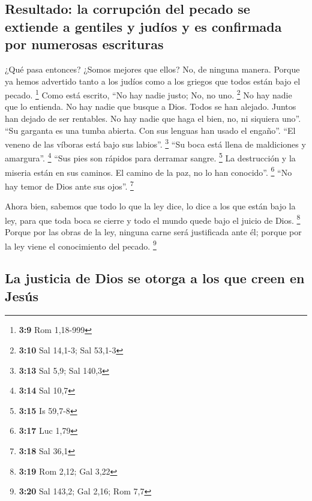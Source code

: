 \begin{paracol}{2}
\hypertarget{resultado-la-corrupciuxf3n-del-pecado-se-extiende-a-gentiles-y-juduxedos-y-es-confirmada-por-numerosas-escrituras}{%
\subsection{Resultado: la corrupción del pecado se extiende a gentiles y
judíos y es confirmada por numerosas
escrituras}\label{resultado-la-corrupciuxf3n-del-pecado-se-extiende-a-gentiles-y-juduxedos-y-es-confirmada-por-numerosas-escrituras}}

 ¿Qué pasa entonces? ¿Somos mejores que ellos? No, de
ninguna manera. Porque ya hemos advertido tanto a los judíos como a los
griegos que todos están bajo el pecado. \footnote{\textbf{3:9} Rom
  1,18-999}  Como está escrito, ``No hay nadie justo; No,
no uno. \footnote{\textbf{3:10} Sal 14,1-3; Sal 53,1-3} 
No hay nadie que lo entienda. No hay nadie que busque a Dios.
 Todos se han alejado. Juntos han dejado de ser
rentables. No hay nadie que haga el bien, no, ni siquiera uno''.
 ``Su garganta es una tumba abierta. Con sus lenguas han
usado el engaño''. ``El veneno de las víboras está bajo sus labios''.
\footnote{\textbf{3:13} Sal 5,9; Sal 140,3}  ``Su boca
está llena de maldiciones y amargura''. \footnote{\textbf{3:14} Sal 10,7}
 ``Sus pies son rápidos para derramar sangre. \footnote{\textbf{3:15}
  Is 59,7-8}  La destrucción y la miseria están en sus
caminos.  El camino de la paz, no lo han conocido''.
\footnote{\textbf{3:17} Luc 1,79}  ``No hay temor de Dios
ante sus ojos''. \footnote{\textbf{3:18} Sal 36,1}

 Ahora bien, sabemos que todo lo que la ley dice, lo dice
a los que están bajo la ley, para que toda boca se cierre y todo el
mundo quede bajo el juicio de Dios. \footnote{\textbf{3:19} Rom 2,12;
  Gal 3,22}  Porque por las obras de la ley, ninguna
carne será justificada ante él; porque por la ley viene el conocimiento
del pecado. \footnote{\textbf{3:20} Sal 143,2; Gal 2,16; Rom 7,7}

\hypertarget{la-justicia-de-dios-se-otorga-a-los-que-creen-en-jesuxfas}{%
\subsection{La justicia de Dios se otorga a los que creen en
Jesús}\label{la-justicia-de-dios-se-otorga-a-los-que-creen-en-jesuxfas}}


\end{paracol}
